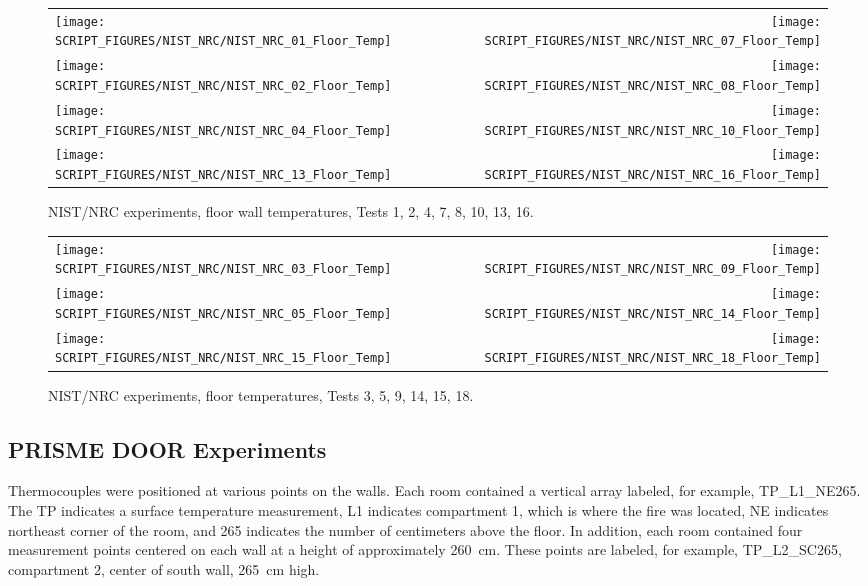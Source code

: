 \begin{figure}[p]
\begin{tabular*}{\textwidth}{l@{\extracolsep{\fill}}r}
\texttt{[image: SCRIPT\_FIGURES/NIST\_NRC/NIST\_NRC\_01\_Floor\_Temp]} &
\texttt{[image: SCRIPT\_FIGURES/NIST\_NRC/NIST\_NRC\_07\_Floor\_Temp]} \\
\texttt{[image: SCRIPT\_FIGURES/NIST\_NRC/NIST\_NRC\_02\_Floor\_Temp]} &
\texttt{[image: SCRIPT\_FIGURES/NIST\_NRC/NIST\_NRC\_08\_Floor\_Temp]} \\
\texttt{[image: SCRIPT\_FIGURES/NIST\_NRC/NIST\_NRC\_04\_Floor\_Temp]} &
\texttt{[image: SCRIPT\_FIGURES/NIST\_NRC/NIST\_NRC\_10\_Floor\_Temp]} \\
\texttt{[image: SCRIPT\_FIGURES/NIST\_NRC/NIST\_NRC\_13\_Floor\_Temp]} &
\texttt{[image: SCRIPT\_FIGURES/NIST\_NRC/NIST\_NRC\_16\_Floor\_Temp]}
\end{tabular*}
\caption{NIST/NRC experiments, floor wall temperatures, Tests 1, 2, 4, 7, 8, 10, 13, 16.}
\label{NIST_NRC_Floor_Temp_Closed}
\end{figure}

\begin{figure}[p]
\begin{tabular*}{\textwidth}{l@{\extracolsep{\fill}}r}
\texttt{[image: SCRIPT\_FIGURES/NIST\_NRC/NIST\_NRC\_03\_Floor\_Temp]} &
\texttt{[image: SCRIPT\_FIGURES/NIST\_NRC/NIST\_NRC\_09\_Floor\_Temp]} \\
\texttt{[image: SCRIPT\_FIGURES/NIST\_NRC/NIST\_NRC\_05\_Floor\_Temp]} &
\texttt{[image: SCRIPT\_FIGURES/NIST\_NRC/NIST\_NRC\_14\_Floor\_Temp]} \\
\texttt{[image: SCRIPT\_FIGURES/NIST\_NRC/NIST\_NRC\_15\_Floor\_Temp]} &
\texttt{[image: SCRIPT\_FIGURES/NIST\_NRC/NIST\_NRC\_18\_Floor\_Temp]}
\end{tabular*}
\caption{NIST/NRC experiments, floor temperatures, Tests 3, 5, 9, 14, 15, 18.}
\label{NIST_NRC_Floor_Temp_Open}
\end{figure}

\clearpage

\subsection{PRISME DOOR Experiments}

Thermocouples were positioned at various points on the walls. Each room contained a vertical array labeled, for example, TP\_L1\_NE265. The TP indicates a surface temperature measurement, L1 indicates compartment 1, which is where the fire was located, NE indicates northeast corner of the room, and 265 indicates the number of centimeters above the floor. In addition, each room contained four measurement points centered on each wall at a height of approximately 260~cm. These points are labeled, for example, TP\_L2\_SC265, compartment 2, center of south wall, 265~cm high.

